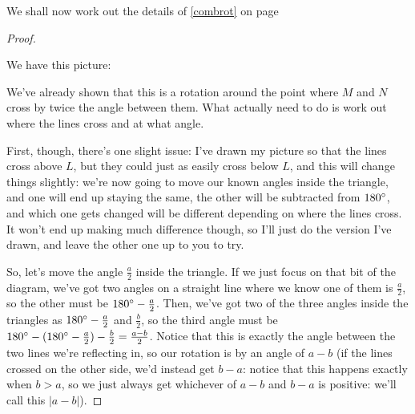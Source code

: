 We shall now work out the details of \ref{combrot} on page \pageref{combref}
\begin{proof}\label{combrotpf}
    
    We have this picture:
    
     We've already shown that this is a rotation around the point where $M$ and $N$ cross by twice the angle between them. What actually need to do is work out where the lines cross and at what angle. 

    First, though, there's one slight issue: I've drawn my picture so that the lines cross above $L$, but they could just as easily cross below $L$, and this will change things slightly: we're now going to move our known angles inside the triangle, and one will end up staying the same, the other will be subtracted from $180\degree$, and which one gets changed will be different depending on where the lines cross. It won't end up making much difference though, so I'll just do the version I've drawn, and leave the other one up to you to try. 

    So, let's move the angle $\frac{a}{2}$ inside the triangle. If we just focus on that bit of the diagram, we've got two angles on a straight line where we know one of them is $\frac{a}{2}$, so the other must be $180\degree - \frac{a}{2}$. Then, we've got two of the three angles inside the triangles as $180\degree - \frac{a}{2}$ and $\frac{b}{2}$, so the third angle must be $180\degree - (180\degree - \frac{a}{2}) - \frac{b}{2} = \frac{a-b}{2}$. Notice that this is exactly the angle between the two lines we're reflecting in, so our rotation is by an angle of $a - b$ (if the lines crossed on the other side, we'd instead get $b - a$: notice that this happens exactly when $b > a$, so we just always get whichever of $a - b$ and $b - a$ is positive: we'll call this $|a - b|$). 


\end{proof}
